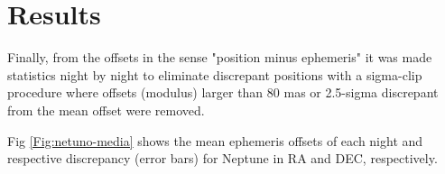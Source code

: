 \documentclass[12pt,a4paper]{report}
\begin{document}
%
%
%

\section*{Results}

Finally, from the offsets in the sense "position minus ephemeris" it was made statistics night by night to eliminate discrepant positions with a sigma-clip procedure where offsets (modulus) larger than 80 mas or 2.5-sigma discrepant from the mean offset were removed.%

Fig \ref{Fig:netuno-media} shows the mean ephemeris offsets of each night and respective discrepancy (error bars) for Neptune in RA and DEC, respectively.





\end{document}
